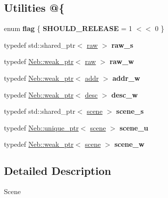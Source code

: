 \subsection*{\-Utilities @\{}
\begin{DoxyCompactItemize}
\item 
enum {\bfseries flag} \{ {\bfseries \-S\-H\-O\-U\-L\-D\-\_\-\-R\-E\-L\-E\-A\-S\-E} =  1 $<$$<$ 0
 \}
\item 
\hypertarget{namespaceNeb_1_1Scene_a758da6570b65687cb8669d67ecf93ba3}{typedef std\-::shared\-\_\-ptr$<$ \hyperlink{classNeb_1_1Scene_1_1raw}{raw} $>$ {\bfseries raw\-\_\-s}}\label{namespaceNeb_1_1Scene_a758da6570b65687cb8669d67ecf93ba3}

\item 
\hypertarget{namespaceNeb_1_1Scene_a491202782a08cfdc79d32cef24cb0251}{typedef \hyperlink{classNeb_1_1weak__ptr}{\-Neb\-::weak\-\_\-ptr}$<$ \hyperlink{classNeb_1_1Scene_1_1raw}{raw} $>$ {\bfseries raw\-\_\-w}}\label{namespaceNeb_1_1Scene_a491202782a08cfdc79d32cef24cb0251}

\item 
\hypertarget{namespaceNeb_1_1Scene_ac9472568202549f7c39e43599fa6dde1}{typedef \hyperlink{classNeb_1_1weak__ptr}{\-Neb\-::weak\-\_\-ptr}$<$ \hyperlink{classNeb_1_1Scene_1_1addr}{addr} $>$ {\bfseries addr\-\_\-w}}\label{namespaceNeb_1_1Scene_ac9472568202549f7c39e43599fa6dde1}

\item 
\hypertarget{namespaceNeb_1_1Scene_aff0eec7abe12304fff16b8dfca022f66}{typedef \hyperlink{classNeb_1_1weak__ptr}{\-Neb\-::weak\-\_\-ptr}$<$ \hyperlink{classNeb_1_1Scene_1_1desc}{desc} $>$ {\bfseries desc\-\_\-w}}\label{namespaceNeb_1_1Scene_aff0eec7abe12304fff16b8dfca022f66}

\item 
\hypertarget{namespaceNeb_1_1Scene_a5eff0becd3fc1ccf4cca7a75eab57827}{typedef std\-::shared\-\_\-ptr$<$ \hyperlink{classNeb_1_1Scene_1_1scene}{scene} $>$ {\bfseries scene\-\_\-s}}\label{namespaceNeb_1_1Scene_a5eff0becd3fc1ccf4cca7a75eab57827}

\item 
\hypertarget{namespaceNeb_1_1Scene_a22af497e9e7ae086a75a14a114d5b5bb}{typedef \hyperlink{classNeb_1_1unique__ptr}{\-Neb\-::unique\-\_\-ptr}$<$ \hyperlink{classNeb_1_1Scene_1_1scene}{scene} $>$ {\bfseries scene\-\_\-u}}\label{namespaceNeb_1_1Scene_a22af497e9e7ae086a75a14a114d5b5bb}

\item 
\hypertarget{namespaceNeb_1_1Scene_a681793a7893bf30dc0677b7faf293ddb}{typedef \hyperlink{classNeb_1_1weak__ptr}{\-Neb\-::weak\-\_\-ptr}$<$ \hyperlink{classNeb_1_1Scene_1_1scene}{scene} $>$ {\bfseries scene\-\_\-w}}\label{namespaceNeb_1_1Scene_a681793a7893bf30dc0677b7faf293ddb}

\end{DoxyCompactItemize}


\subsection{\-Detailed \-Description}
\-Scene 